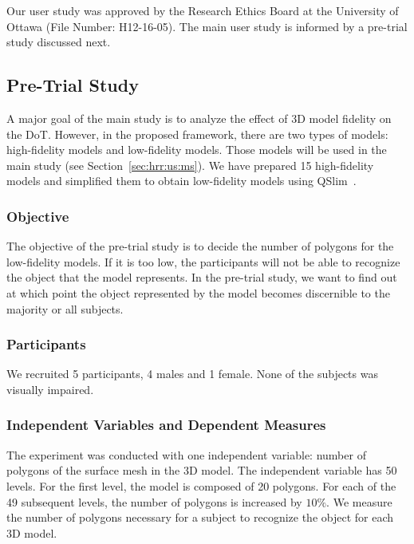 Our user study was approved by the Research Ethics Board at the University of Ottawa (File Number: H12-16-05).
The main user study is informed by a pre-trial study discussed next.

\subsection{Pre-Trial Study}
\label{sec:hrr:us:pts}

A major goal of the main study is to analyze the effect of 3D model fidelity on the DoT. However, in the proposed framework, there are two types of models: high-fidelity models and low-fidelity models. Those models will be used in the main study (see Section~\ref{sec:hrr:us:ms}). We have prepared 15 high-fidelity models and simplified them to obtain low-fidelity models using QSlim~\cite{garland1997}.

\subsubsection{Objective}
\label{sec:hrr:us:pts:o}

The objective of the pre-trial study is to decide the number of polygons for the low-fidelity models. If it is too low, the participants will not be able to recognize the object that the model represents. In the pre-trial study, we want to find out at which point the object represented by the model becomes discernible to the majority or all subjects.

\subsubsection{Participants}
\label{sec:hrr:us:pts:par}

We recruited 5 participants, 4 males and 1 female. None of the subjects was visually impaired.

\subsubsection{Independent Variables and Dependent Measures}
\label{sec:hrr:us:pts:ivdm}

The experiment was conducted with one independent variable: number of polygons of the surface mesh in the 3D model.
The independent variable has 50 levels. For the first level, the model is composed of 20 polygons. For each of the 49 subsequent levels, the number of polygons is increased by $10\%$. We measure the number of polygons necessary for a subject to recognize the object for each 3D model.

